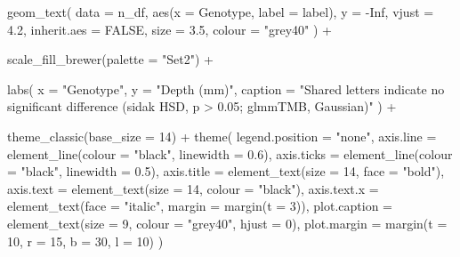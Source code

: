 \documentclass[
  letterpaper,
  DIV=11,
  numbers=noendperiod]{scrartcl}
\newenvironment{Shaded}{\begin{snugshade}}{\end{snugshade}}
\newcommand{\AttributeTok}[1]{\textcolor[rgb]{0.40,0.45,0.13}{#1}}
\newcommand{\ConstantTok}[1]{\textcolor[rgb]{0.56,0.35,0.01}{#1}}
\newcommand{\DecValTok}[1]{\textcolor[rgb]{0.68,0.00,0.00}{#1}}
\newcommand{\FloatTok}[1]{\textcolor[rgb]{0.68,0.00,0.00}{#1}}
\newcommand{\FunctionTok}[1]{\textcolor[rgb]{0.28,0.35,0.67}{#1}}
\newcommand{\NormalTok}[1]{\textcolor[rgb]{0.00,0.23,0.31}{#1}}
\newcommand{\SpecialCharTok}[1]{\textcolor[rgb]{0.37,0.37,0.37}{#1}}
\newcommand{\StringTok}[1]{\textcolor[rgb]{0.13,0.47,0.30}{#1}}
\newcounter{none} %
\begin{document}
\begin{Shaded}
\begin{Highlighting}[]
  \FunctionTok{geom\_text}\NormalTok{(}
    \AttributeTok{data        =}\NormalTok{ n\_df,}
    \FunctionTok{aes}\NormalTok{(}\AttributeTok{x =}\NormalTok{ Genotype, }\AttributeTok{label =}\NormalTok{ label),}
    \AttributeTok{y           =} \SpecialCharTok{{-}}\ConstantTok{Inf}\NormalTok{,}
    \AttributeTok{vjust       =} \FloatTok{4.2}\NormalTok{,}
    \AttributeTok{inherit.aes =} \ConstantTok{FALSE}\NormalTok{,}
    \AttributeTok{size        =} \FloatTok{3.5}\NormalTok{,}
    \AttributeTok{colour      =} \StringTok{"grey40"}
\NormalTok{  ) }\SpecialCharTok{+}

  \FunctionTok{scale\_fill\_brewer}\NormalTok{(}\AttributeTok{palette =} \StringTok{"Set2"}\NormalTok{) }\SpecialCharTok{+}

  \FunctionTok{labs}\NormalTok{(}
    \AttributeTok{x       =} \StringTok{"Genotype"}\NormalTok{,}
    \AttributeTok{y       =} \StringTok{"Depth (mm)"}\NormalTok{,}
    \AttributeTok{caption =} \StringTok{"Shared letters indicate no significant difference (sidak HSD, p \textgreater{} 0.05; glmmTMB, Gaussian)"}
\NormalTok{  ) }\SpecialCharTok{+}

  \FunctionTok{theme\_classic}\NormalTok{(}\AttributeTok{base\_size =} \DecValTok{14}\NormalTok{) }\SpecialCharTok{+}
  \FunctionTok{theme}\NormalTok{(}
    \AttributeTok{legend.position =} \StringTok{"none"}\NormalTok{,}
    \AttributeTok{axis.line       =} \FunctionTok{element\_line}\NormalTok{(}\AttributeTok{colour =} \StringTok{"black"}\NormalTok{, }\AttributeTok{linewidth =} \FloatTok{0.6}\NormalTok{),}
    \AttributeTok{axis.ticks      =} \FunctionTok{element\_line}\NormalTok{(}\AttributeTok{colour =} \StringTok{"black"}\NormalTok{, }\AttributeTok{linewidth =} \FloatTok{0.5}\NormalTok{),}
    \AttributeTok{axis.title      =} \FunctionTok{element\_text}\NormalTok{(}\AttributeTok{size =} \DecValTok{14}\NormalTok{, }\AttributeTok{face =} \StringTok{"bold"}\NormalTok{),}
    \AttributeTok{axis.text       =} \FunctionTok{element\_text}\NormalTok{(}\AttributeTok{size =} \DecValTok{14}\NormalTok{, }\AttributeTok{colour =} \StringTok{"black"}\NormalTok{),}
    \AttributeTok{axis.text.x     =} \FunctionTok{element\_text}\NormalTok{(}\AttributeTok{face =} \StringTok{"italic"}\NormalTok{, }\AttributeTok{margin =} \FunctionTok{margin}\NormalTok{(}\AttributeTok{t =} \DecValTok{3}\NormalTok{)),}
    \AttributeTok{plot.caption    =} \FunctionTok{element\_text}\NormalTok{(}\AttributeTok{size =} \DecValTok{9}\NormalTok{, }\AttributeTok{colour =} \StringTok{"grey40"}\NormalTok{, }\AttributeTok{hjust =} \DecValTok{0}\NormalTok{),}
    \AttributeTok{plot.margin     =} \FunctionTok{margin}\NormalTok{(}\AttributeTok{t =} \DecValTok{10}\NormalTok{, }\AttributeTok{r =} \DecValTok{15}\NormalTok{, }\AttributeTok{b =} \DecValTok{30}\NormalTok{, }\AttributeTok{l =} \DecValTok{10}\NormalTok{)}
\NormalTok{  )}


\end{Highlighting}
\end{Shaded}
\end{document}
